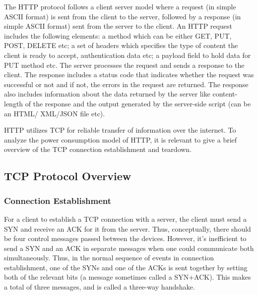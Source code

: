 \documentclass{sigplanconf}
\begin{document}
The HTTP protocol follows a client server model where a request (in simple ASCII format) is sent from the client to the server, followed by a response (in simple ASCII format) sent from the server to the client. An HTTP request includes the following elements: a method which can be either GET, PUT, POST, DELETE etc; a set of headers which specifies the type of content the client is ready to accept, authentication data etc; a payload field to hold data for PUT method etc. The server processes the request and sends a response to the client. The response includes a status code that indicates whether the request was successful or not and if not, the errors in the request are returned. The response also includes information about the data returned by the server like content-length of the response and the output generated by the server-side script (can be an HTML/ XML/JSON file etc). 

HTTP utilizes TCP for reliable transfer of information over the internet. To analyze the power consumption model of HTTP, it is relevant to give a brief overview of the TCP connection establishment and teardown.



\subsection{TCP Protocol Overview}
\subsubsection{Connection Establishment}
For a client to establish a TCP connection with a server, the client must send a SYN and receive an ACK for it from the server. Thus, conceptually, there should be four control messages passed between the devices. However, it's inefficient to send a SYN and an ACK in separate messages when one could communicate both simultaneously. Thus, in the normal sequence of events in connection establishment, one of the SYNs and one of the ACKs is sent together by setting both of the relevant bits (a message sometimes called a SYN+ACK). This makes a total of three messages, and is called a three-way handshake.
\end{document}
